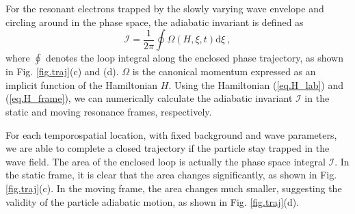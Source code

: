 For the resonant electrons trapped by the slowly varying wave envelope and circling around in the phase space,  the adiabatic invariant is defined as
\begin{equation}\label{eq.def_I}
    \mathcal{I} = \frac{1}{2\pi} \oint \Omega(H,\xi,t) \mathrm{d} \xi~,
\end{equation}
where $\oint$ denotes the loop integral along the enclosed phase trajectory, as shown in Fig. \ref{fig.traj}(c) and (d). 
$\Omega$ is the canonical momentum expressed as an implicit function of the Hamiltonian $H$.
Using the Hamiltonian (\ref{eq.H_lab}) and (\ref{eq.H_frame}), 
we can numerically calculate the adiabatic invariant $\mathcal{I}$  in the static and moving resonance frames, respectively.


For each temporospatial location, with fixed background and wave parameters, we are able to complete a closed trajectory if the particle stay trapped in the wave field.  
The area of the enclosed loop is actually the phase space integral $\mathcal{I}$.
In the static frame, it is clear that the area changes significantly,
as shown in Fig. \ref{fig.traj}(c). In the moving frame, the area changes much smaller, suggesting the validity of the particle adiabatic motion, as shown in Fig. \ref{fig.traj}(d). 

